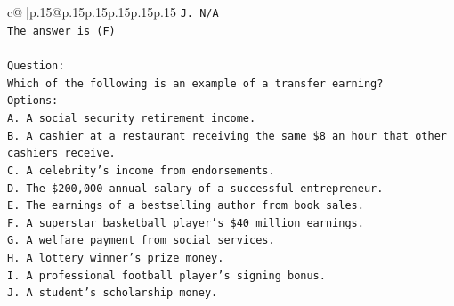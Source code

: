 \documentclass{article}
\begin{document}
{\begin{supertabular}{c@{$\;$}|p{.15\linewidth}@{}p{.15\linewidth}p{.15\linewidth}p{.15\linewidth}p{.15\linewidth}p{.15\linewidth}}
{{{\texttt{J. N/A} \\
\texttt{The answer is (F)} \\
\\ 
\texttt{Question:} \\
\texttt{Which of the following is an example of a transfer earning?} \\
\texttt{Options:} \\
\texttt{A. A social security retirement income.} \\
\texttt{B. A cashier at a restaurant receiving the same \$8 an hour that other cashiers receive.} \\
\texttt{C. A celebrity's income from endorsements.} \\
\texttt{D. The \$200,000 annual salary of a successful entrepreneur.} \\
\texttt{E. The earnings of a bestselling author from book sales.} \\
\texttt{F. A superstar basketball player's \$40 million earnings.} \\
\texttt{G. A welfare payment from social services.} \\
\texttt{H. A lottery winner's prize money.} \\
\texttt{I. A professional football player's signing bonus.} \\
\texttt{J. A student's scholarship money.} \\
            }
        }
    }
     \\ \\


\end{supertabular}}
\end{document}
